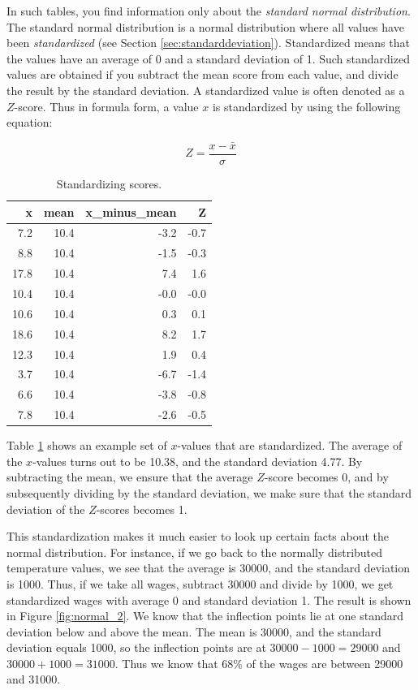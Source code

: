 \documentclass[]{book}\usepackage[]{graphicx}\usepackage[]{color}
\begin{document}
In such tables, you find information only about the \textit{standard normal distribution}. The standard normal distribution is a normal distribution where all values have been \textit{standardized} (see Section \ref{sec:standarddeviation}). Standardized means that the values have an average of 0 and a standard deviation of 1. Such standardized values are obtained if you subtract the mean score from each value, and divide the result by the standard deviation. A standardized value is often denoted as a $Z$-score. Thus in formula form, a value $x$ is standardized by using the following equation:


\begin{equation}
Z = \frac{x - \bar{x}}{\sigma}
\end{equation}



\begin{table}[ht]
\centering
\caption{Standardizing scores.} 
\label{tab:normal_1}
\begin{tabular}{rrrr}
  \hline
x & mean & x\_minus\_mean & Z \\ 
  \hline
7.2 & 10.4 & -3.2 & -0.7 \\ 
  8.8 & 10.4 & -1.5 & -0.3 \\ 
  17.8 & 10.4 & 7.4 & 1.6 \\ 
  10.4 & 10.4 & -0.0 & -0.0 \\ 
  10.6 & 10.4 & 0.3 & 0.1 \\ 
  18.6 & 10.4 & 8.2 & 1.7 \\ 
  12.3 & 10.4 & 1.9 & 0.4 \\ 
  3.7 & 10.4 & -6.7 & -1.4 \\ 
  6.6 & 10.4 & -3.8 & -0.8 \\ 
  7.8 & 10.4 & -2.6 & -0.5 \\ 
   \hline
\end{tabular}
\end{table}


Table \ref{tab:normal_1} shows an example set of $x$-values that are standardized. The average of the $x$-values turns out to be 10.38, and the standard deviation 4.77. By subtracting the mean, we ensure that the average $Z$-score becomes 0, and by subsequently dividing by the standard deviation, we make sure that the standard deviation of the $Z$-scores becomes 1.

This standardization makes it much easier to look up certain facts about the normal distribution. For instance, if we go back to the normally distributed temperature values, we see that the average is 30000, and the standard deviation is 1000. Thus, if we take all wages, subtract 30000 and divide by 1000, we get standardized wages with average 0 and standard deviation 1. The result is shown in Figure \ref{fig:normal_2}. We know that the inflection points lie at one standard deviation below and above the mean. The mean is 30000, and the standard deviation equals 1000, so the inflection points are at $30000-1000=29000$ and $30000+1000=31000$. Thus we know that 68\% of the wages are between 29000 and 31000.
\end{document}
